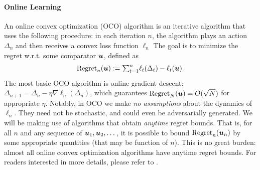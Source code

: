 \paragraph{Online Learning}
An online convex optimization (OCO) algorithm is an iterative algorithm that uses the following procedure: in each iteration $n$, the algorithm plays an action $\Delta_n$ and then receives a convex  loss function $\ell_n$ The goal is to minimize the regret w.r.t. some comparator ${\boldsymbol{u}}$, defined as
\begin{equation*}
    \mathrm{Regret}_n({\boldsymbol{u}}) := {\textstyle \sum}_{t=1}^n \ell_t(\Delta_t) - \ell_t({\boldsymbol{u}}).
\end{equation*}
The most basic OCO algorithm is online gradient  descent: $\Delta_{n+1} = \Delta_n - \eta \nabla \ell_n(\Delta_n)$, which guarantees $\mathrm{Regret}_N({\boldsymbol{u}}) =O(\sqrt{N})$ for appropriate $\eta$. Notably, in OCO we make \emph{no assumptions} about the dynamics of $\ell_n$. They need not be stochastic, and could even be adversarially generated. We will be making use of algorithms that obtain \emph{anytime} regret bounds. That is, for all $n$ and any sequence of ${\boldsymbol{u}}_1,{\boldsymbol{u}}_2,\dots$, it is possible to bound $\mathrm{Regret}_n({\boldsymbol{u}}_n)$ by some appropriate quantities (that may be function of $n$). This is no great burden: almost all online convex optimization algorithms have anytime regret bounds.
For readers interested in more details, please refer to \cite{cesa2006prediction, hazan2019introduction, orabona2019modern}.





